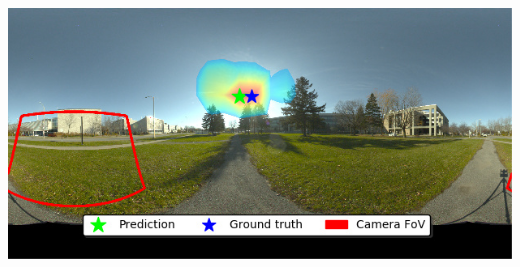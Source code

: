 \begin{minipage}{\linewidth}
\begin{multicols}{4}
\vspace{\panoheight}\\
\includegraphics[width=\mywidth]{AG8A2833_Panorama_hdr-corrected_004.jpg}\\

\end{multicols}
\end{minipage}


